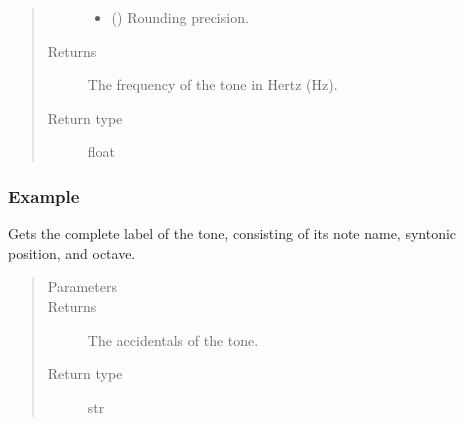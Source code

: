 \documentclass[letterpaper,10pt,english]{sphinxmanual}
\begin{document}
\begin{fulllineitems}
\begin{fulllineitems}
\begin{quote}
\begin{description}
\begin{itemize}
\item {} 
 () \textendash{} Rounding precision.

\end{itemize}

\item[{Returns}] \leavevmode
The frequency of the tone in Hertz (Hz).

\item[{Return type}] \leavevmode
float

\end{description}\end{quote}
\subsubsection*{Example}

\begin{sphinxVerbatim}[commandchars=\\\{\}]
  
\end{sphinxVerbatim}

\end{fulllineitems}


\begin{fulllineitems}
\label{\detokenize{api:main.Tone.get_label}}
Gets the complete label of the tone, consisting of its note name, syntonic position, and octave.
\begin{quote}\begin{description}
\item[{Parameters}] \leavevmode
{} \textendash{} 

\item[{Returns}] \leavevmode
The accidentals of the tone.

\item[{Return type}] \leavevmode
str

\end{description}\end{quote}

\end{fulllineitems}
\end{fulllineitems}
\end{document}
